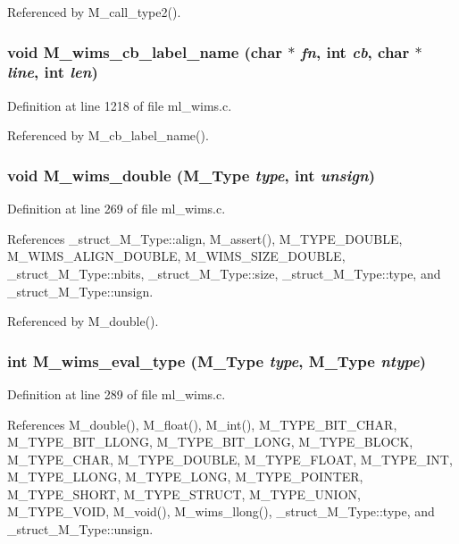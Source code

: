Referenced by M\_\-call\_\-type2().
\subsubsection{\setlength{\rightskip}{0pt plus 5cm}void M\_\-wims\_\-cb\_\-label\_\-name (char $\ast$ {\em fn}, int {\em cb}, char $\ast$ {\em line}, int {\em len})}\label{ml__wims_8c_9ef233f7ce6f06e330494ac6b22158cb}




Definition at line 1218 of file ml\_\-wims.c.

Referenced by M\_\-cb\_\-label\_\-name().
\subsubsection{\setlength{\rightskip}{0pt plus 5cm}void M\_\-wims\_\-double (\bf{M\_\-Type} {\em type}, int {\em unsign})}\label{ml__wims_8c_6be6ed3ff4ec5e30ae7b8c099b691fc4}




Definition at line 269 of file ml\_\-wims.c.

References \_\-struct\_\-M\_\-Type::align, M\_\-assert(), M\_\-TYPE\_\-DOUBLE, M\_\-WIMS\_\-ALIGN\_\-DOUBLE, M\_\-WIMS\_\-SIZE\_\-DOUBLE, \_\-struct\_\-M\_\-Type::nbits, \_\-struct\_\-M\_\-Type::size, \_\-struct\_\-M\_\-Type::type, and \_\-struct\_\-M\_\-Type::unsign.

Referenced by M\_\-double().
\subsubsection{\setlength{\rightskip}{0pt plus 5cm}int M\_\-wims\_\-eval\_\-type (\bf{M\_\-Type} {\em type}, \bf{M\_\-Type} {\em ntype})}\label{ml__wims_8c_e2eb5f2b02c0e0b3d097a56ab71f6a06}




Definition at line 289 of file ml\_\-wims.c.

References M\_\-double(), M\_\-float(), M\_\-int(), M\_\-TYPE\_\-BIT\_\-CHAR, M\_\-TYPE\_\-BIT\_\-LLONG, M\_\-TYPE\_\-BIT\_\-LONG, M\_\-TYPE\_\-BLOCK, M\_\-TYPE\_\-CHAR, M\_\-TYPE\_\-DOUBLE, M\_\-TYPE\_\-FLOAT, M\_\-TYPE\_\-INT, M\_\-TYPE\_\-LLONG, M\_\-TYPE\_\-LONG, M\_\-TYPE\_\-POINTER, M\_\-TYPE\_\-SHORT, M\_\-TYPE\_\-STRUCT, M\_\-TYPE\_\-UNION, M\_\-TYPE\_\-VOID, M\_\-void(), M\_\-wims\_\-llong(), \_\-struct\_\-M\_\-Type::type, and \_\-struct\_\-M\_\-Type::unsign.

